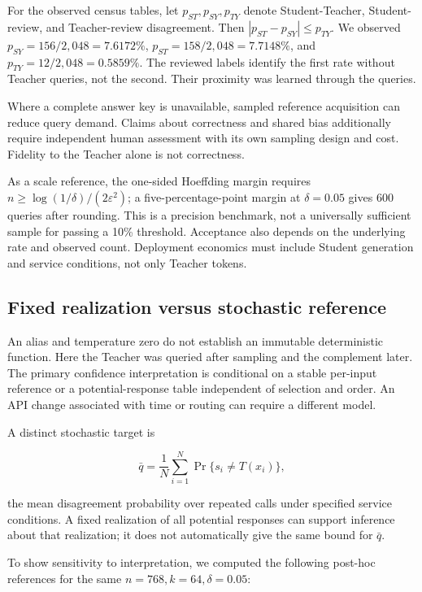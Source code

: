 \documentclass[
  10pt,
]{article}
\begin{document}
For the observed census tables, let \(p_{ST},p_{SY},p_{TY}\) denote
Student-Teacher, Student-review, and Teacher-review disagreement. Then
\(|p_{ST}-p_{SY}|\le p_{TY}\). We observed
\(p_{SY}=156/2,048=7.6172\%\), \(p_{ST}=158/2,048=7.7148\%\), and
\(p_{TY}=12/2,048=0.5859\%\). The reviewed labels identify the first
rate without Teacher queries, not the second. Their proximity was
learned through the queries.

Where a complete answer key is unavailable, sampled reference
acquisition can reduce query demand. Claims about correctness and shared
bias additionally require independent human assessment with its own
sampling design and cost. Fidelity to the Teacher alone is not
correctness.

As a scale reference, the one-sided Hoeffding margin requires
\(n\ge\log(1/\delta)/(2\varepsilon^2)\); a five-percentage-point margin
at \(\delta=0.05\) gives 600 queries after rounding. This is a precision
benchmark, not a universally sufficient sample for passing a 10\%
threshold. Acceptance also depends on the underlying rate and observed
count. Deployment economics must include Student generation and service
conditions, not only Teacher tokens.

\hypertarget{fixed-realization-versus-stochastic-reference}{%
\subsection{Fixed realization versus stochastic
reference}\label{fixed-realization-versus-stochastic-reference}}

An alias and temperature zero do not establish an immutable
deterministic function. Here the Teacher was queried after sampling and
the complement later. The primary confidence interpretation is
conditional on a stable per-input reference or a potential-response
table independent of selection and order. An API change associated with
time or routing can require a different model.

A distinct stochastic target is

\[\bar q=\frac1N\sum_{i=1}^N\Pr\{s_i\ne T(x_i)\},\]

the mean disagreement probability over repeated calls under specified
service conditions. A fixed realization of all potential responses can
support inference about that realization; it does not automatically give
the same bound for \(\bar q\).

To show sensitivity to interpretation, we computed the following
post-hoc references for the same \(n=768,k=64,\delta=0.05\):
\end{document}
